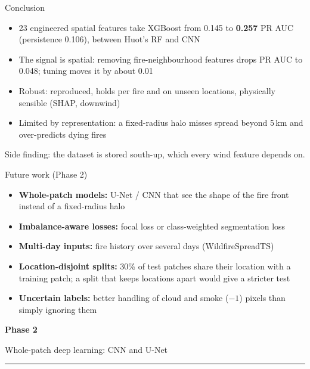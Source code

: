 \documentclass[aspectratio=169,11pt]{beamer}
\newcommand{\src}[1]{\par\vfill{\scriptsize\color{muted}#1}}
\begin{document}
\begin{frame}{Conclusion}
\begin{itemize}
\item 23 engineered spatial features take XGBoost from 0.145 to \textbf{0.257} PR AUC (persistence 0.106), between Huot's RF and CNN
\item The signal is spatial: removing fire-neighbourhood features drops PR AUC to 0.048; tuning moves it by about 0.01
\item Robust: reproduced, holds per fire and on unseen locations, physically sensible (SHAP, downwind)
\item Limited by representation: a fixed-radius halo misses spread beyond 5\,km and over-predicts dying fires
\end{itemize}
\src{Side finding: the dataset is stored south-up, which every wind feature depends on.}
\end{frame}

\begin{frame}{Future work (Phase 2)}
\begin{itemize}
\item \textbf{Whole-patch models:} U-Net / CNN that see the shape of the fire front instead of a fixed-radius halo
\item \textbf{Imbalance-aware losses:} focal loss or class-weighted segmentation loss
\item \textbf{Multi-day inputs:} fire history over several days (WildfireSpreadTS)
\item \textbf{Location-disjoint splits:} 30\% of test patches share their location with a training patch; a split that keeps locations apart would give a stricter test
\item \textbf{Uncertain labels:} better handling of cloud and smoke ($-1$) pixels than simply ignoring them
\end{itemize}
\end{frame}

\begin{frame}[plain]
\vfill
{\color{accent}\Huge\bfseries Phase 2\par}
\vspace{0.4em}
{\large Whole-patch deep learning: CNN and U-Net\par}
\vspace{0.4em}
{\color{accent}\rule{3cm}{1.5pt}\par}
\vfill
\end{frame}
\end{document}
